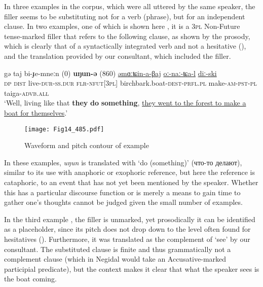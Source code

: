 \documentclass[output=paper]{langscibook}
\begin{document}
In three examples in the corpus, which were all uttered by the same speaker, the filler seems to be substituting not for a verb (phrase), but for an independent clause.  In two examples, one of which is shown here , it is a 3\textsc{pl} Non-Future tense-marked filler that refers to the following clause, as shown by the prosody, which is clearly that of a syntactically integrated verb and not a hesitative (), and the translation provided by our consultant, which included the filler. 

\ea \label{ex:pakendorf:43}
\gll gə
	taj
	bi-ɟe-mneːn
	\textup{(0)}
	\textbf{uŋun-ə}
	\textup{(860)}
	\uline{əmɑːʨin-a-βaj}
	\uline{oː-naː-ʨa-l}
	\uline{diː-ski}\\
     \textsc{dp}
     \textsc{dist}
     live-\textsc{dur-ss.dur}
     {}
     \textsc{flr-nfut[3pl]}
     {}
     birchbark.boat-\textsc{dest}-\textsc{prfl.pl}
     make-\textsc{am-pst-pl}
     taiga-\textsc{advb.all}\\
\glt ‘Well, living like that \textbf{they} \textbf{do} \textbf{something}, \uline{they went to the forest to make a boat for themselves}.’ 
\z

\begin{figure}
\texttt{[image: Fig14\_485.pdf]}
\caption{Waveform and pitch contour of example }
\label{fig:pakendorf:14}
\end{figure}

In these examples, \textit{uŋun} is translated with ‘do (something)’ ({что}-{то} {делают}), similar to its use with anaphoric or exophoric reference, but here the reference is cataphoric, to an event that has not yet been mentioned by the speaker. Whether this has a particular discourse function or is merely a means to gain time to gather one’s thoughts cannot be judged given the small number of examples.

In the third example , the filler is unmarked, yet prosodically it can be identified as a placeholder, since its pitch does not drop down to the level often found for hesitatives (). Furthermore, it was translated as the complement of ‘see’ by our consultant. The substituted clause is finite and thus grammatically not a complement clause (which in Negidal would take an Accusative-marked participial predicate), but the context makes it clear that what the speaker sees is the boat coming.
\end{document}
